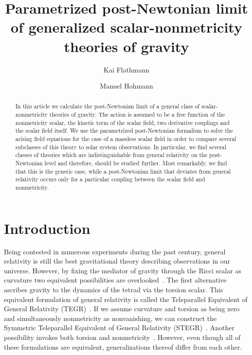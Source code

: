 \documentclass[notitlepage,a4paper,aps,prd,onecolumn,superscriptaddress,nofootinbib,groupedaddress,longbibliography]{revtex4-2}
\begin{document}
\title{Parametrized post-Newtonian limit of generalized scalar-nonmetricity theories of gravity}

\author{Kai Flathmann}

\author{Manuel Hohmann}



\begin{abstract}
In this article we calculate the post-Newtonian limit of a general class of scalar-nonmetricity theories of gravity. The action is assumed to be a free function of the nonmetricity scalar, the kinetic term of the scalar field, two derivative couplings and the scalar field itself. We use the parametrized post-Newtonian formalism to solve the arising field equations for the case of a massless scalar field in order to compare several subclasses of this theory to solar system observations. In particular, we find several classes of theories which are indistinguishable from general relativity on the post-Newtonian level and therefore, should be studied further. Most remarkably, we find that this is the generic case, while a post-Newtonian limit that deviates from general relativity occurs only for a particular coupling between the scalar field and nonmetricity.
\end{abstract}

\maketitle


\section{Introduction}\label{sec:intro}
Being contested in numerous experiments during the past century, general relativity is still the best gravitational theory describing observations in our universe. However, by fixing the mediator of gravity through the Ricci scalar as curvature two equivalent possibilities are overlooked~\cite{BeltranJimenez:2019tjy}. The first alternative ascribes gravity to the dynamics of the tetrad via the torsion scalar. This equivalent formulation of general relativity is called the Teleparallel Equivalent of General Relativity (TEGR)~\cite{Aldrovandi:2013wha,Bahamonde:2021gfp}. If we assume curvature and torsion as being zero and simultaneously nonmetricity as nonvanishing, we can construct the Symmetric Teleparallel Equivalent of General Relativity (STEGR)~\cite{Nester:1998mp,Adak:2005cd,Adak:2008gd,Mol:2014ooa,Adak:2018vzk,Jimenez:2019yyx,DAmbrosio:2020nqu,DAmbrosio:2020njs}. Another possibility invokes both torsion and nonmetricity~\cite{Jimenez:2019ghw,Boehmer:2021aji}. However, even though all of these formulations are equivalent, generalizations thereof differ from each other.
\end{document}
